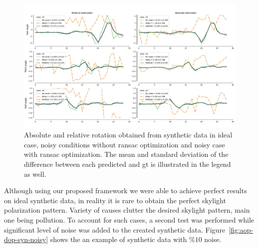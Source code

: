 \begin{figure}
  \centering
  \includegraphics[width=1\textwidth]{./content/experiments/figures/syn-res.jpeg}
  \caption{Absolute and relative rotation obtained from synthetic data in ideal
  case, noisy conditions without ransac optimization and noisy case with ransac
optimization. The mean and standard deviation of the difference between each
predicted and \gls{gt} is illustrated in the legend as well.}
  \label{fig:res-syn}
\end{figure}


Although using our proposed framework we were able to achieve perfect results
on ideal synthetic data, in reality it is rare to obtain the perfect skylight
polarization pattern. Variety of causes clutter the desired skylight pattern,
main one being pollution. To account for such cases, a second test was
performed while significant level of noise was added to the created synthetic
data.
Figure~\ref{fig:aop-dop-syn-noisy} shows the an example of synthetic data with
$\%10$ noise.

